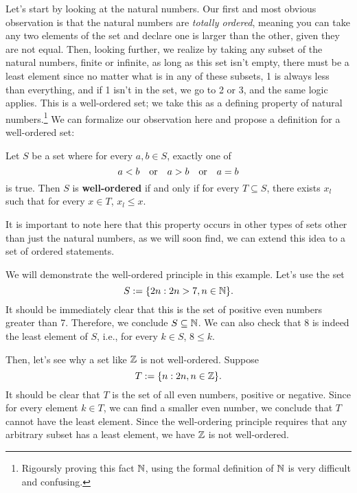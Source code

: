 Let's start by looking at the natural numbers. Our first and most obvious observation is that the natural numbers are \textit{totally ordered},
meaning you can take any two elements of the set and declare one is larger than the other, given they are not equal. 
Then, looking further, we realize by taking any subset of the natural numbers, finite or infinite, as long as this set isn't empty, there must be a least element since no matter what is in any of these subsets, 1 is always less than everything, and if 1 isn't in the set, we go to 2 or 3, and the same logic applies. This is a well-ordered set; we take this as a defining property of natural numbers.\footnote{Rigoursly proving this fact $\mathbb{N}$, using the formal definition of $\mathbb{N}$ is very difficult and confusing.}
We can formalize our observation here and propose a definition for a well-ordered set:
\begin{define}
	Let $S$ be a set where for every $a,b\in S$, exactly one of
	$$a<b \quad\text{or}\quad a>b \quad\text{or}\quad a=b$$
	is true. Then $S$ is \textbf{well-ordered} if and only if for every $T\subseteq S$, there exists $x_l$ such that for every $x\in T$, $x_l\le x$.
\end{define}

It is important to note here that this property occurs in other types of sets other than just the natural numbers, as we will soon find, we can extend this idea to a set of ordered statements.

\begin{ex}
	We will demonstrate the well-ordered principle in this example. Let's use the set
	$$S:=\{2n: 2n>7, n\in\mathbb{N}\}.$$
	It should be immediately clear that this is the set of positive even numbers greater than 7. Therefore, we conclude $S\subseteq \mathbb{N}$.
	We can also check that $8$ is indeed the least element of $S$, i.e., for every $k\in S$, $8\le k$.
	
	Then, let's see why a set like $\mathbb{Z}$ is not well-ordered. Suppose
	$$T:=\{n:2n,n\in \mathbb{Z}\}.$$
	It should be clear that $T$ is the set of all even numbers, positive or negative.
	Since for every element $k\in T$, we can find a smaller even number, we conclude that $T$ cannot have the least element.
	Since the well-ordering principle requires that any arbitrary subset has a least element, we have $\mathbb{Z}$ is not well-ordered.
\end{ex}

